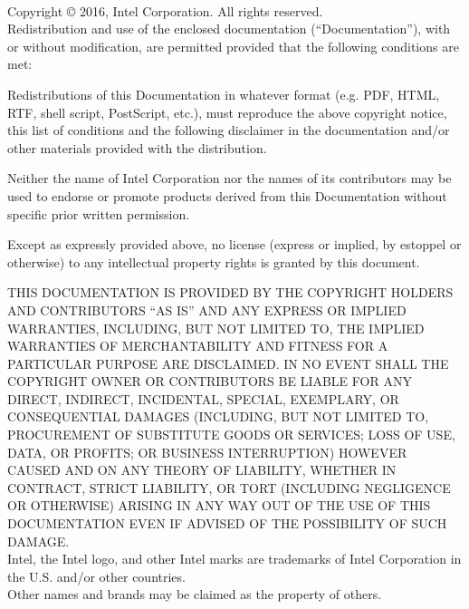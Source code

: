 
\vspace*{3.0cm}
 \\ 

\vspace*{0.5cm}

\noindent Copyright {\small\copyright} 2016, Intel Corporation. All rights reserved. \\

\noindent Redistribution and use of the enclosed documentation
(``Documentation''),  with or without modification, are permitted provided that
the following conditions are met:

\begin{itemize*}
\item Redistributions of this Documentation in whatever format (e.g. PDF,
         HTML, RTF, shell script, PostScript, etc.), must reproduce the above
         copyright notice, this list of conditions and the following disclaimer
         in the documentation and/or other materials provided with the
         distribution.

\item  Neither the name of Intel Corporation nor the names of its
         contributors may be used to endorse or promote products derived from
         this Documentation without specific prior written permission.
\end{itemize*}

\noindent Except as expressly provided above, no license (express or implied, by estoppel
or otherwise) to any intellectual property rights is granted by this document.

\vspace*{0.5cm}

{\footnotesize

\noindent THIS DOCUMENTATION IS PROVIDED BY THE COPYRIGHT HOLDERS AND
CONTRIBUTORS ``AS IS'' AND ANY EXPRESS OR IMPLIED WARRANTIES, INCLUDING, BUT
NOT LIMITED TO, THE IMPLIED WARRANTIES OF MERCHANTABILITY AND FITNESS FOR A
PARTICULAR PURPOSE ARE DISCLAIMED. IN NO EVENT SHALL THE COPYRIGHT OWNER OR
CONTRIBUTORS BE LIABLE FOR ANY DIRECT, INDIRECT, INCIDENTAL, SPECIAL,
EXEMPLARY, OR CONSEQUENTIAL DAMAGES (INCLUDING, BUT NOT LIMITED TO, PROCUREMENT
OF SUBSTITUTE GOODS OR SERVICES; LOSS OF USE, DATA, OR PROFITS; OR BUSINESS
INTERRUPTION) HOWEVER CAUSED AND ON ANY THEORY OF LIABILITY, WHETHER IN
CONTRACT, STRICT LIABILITY, OR TORT (INCLUDING NEGLIGENCE OR OTHERWISE) ARISING
IN ANY WAY OUT OF THE USE OF THIS DOCUMENTATION EVEN IF ADVISED OF THE
POSSIBILITY OF SUCH DAMAGE. \\

\noindent Intel, the Intel logo, and other Intel marks are trademarks of Intel
Corporation in the U.S. and/or other countries. \\

\noindent *Other names and brands may be claimed as the property of others. \\



}
